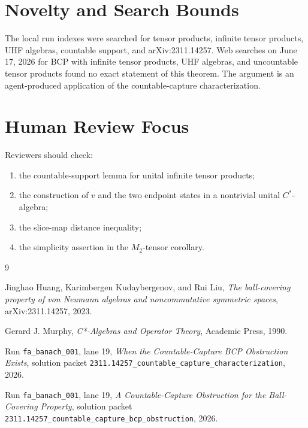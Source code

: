 \documentclass[11pt]{article}
\begin{document}
\section*{Novelty and Search Bounds}

The local run indexes were searched for tensor products, infinite tensor
products, UHF algebras, countable support, and arXiv:2311.14257.  Web searches
on June 17, 2026 for BCP with infinite tensor products, UHF algebras, and
uncountable tensor products found no exact statement of this theorem.  The
argument is an agent-produced application of the countable-capture
characterization.

\section*{Human Review Focus}

Reviewers should check:
\begin{enumerate}
    \item the countable-support lemma for unital infinite tensor products;
    \item the construction of \(v\) and the two endpoint states in a
          nontrivial unital \(C^*\)-algebra;
    \item the slice-map distance inequality;
    \item the simplicity assertion in the \(M_2\)-tensor corollary.
\end{enumerate}

\begin{thebibliography}{9}

Jinghao Huang, Karimbergen Kudaybergenov, and Rui Liu,
\emph{The ball-covering property of von Neumann algebras and noncommutative
symmetric spaces},
arXiv:2311.14257, 2023.

Gerard J. Murphy,
\emph{C*-Algebras and Operator Theory},
Academic Press, 1990.

Run \texttt{fa\_banach\_001}, lane 19,
\emph{When the Countable-Capture BCP Obstruction Exists},
solution packet
\texttt{2311.14257\_countable\_capture\_characterization}, 2026.

Run \texttt{fa\_banach\_001}, lane 19,
\emph{A Countable-Capture Obstruction for the Ball-Covering Property},
solution packet
\texttt{2311.14257\_countable\_capture\_bcp\_obstruction}, 2026.

\end{thebibliography}
\end{document}
